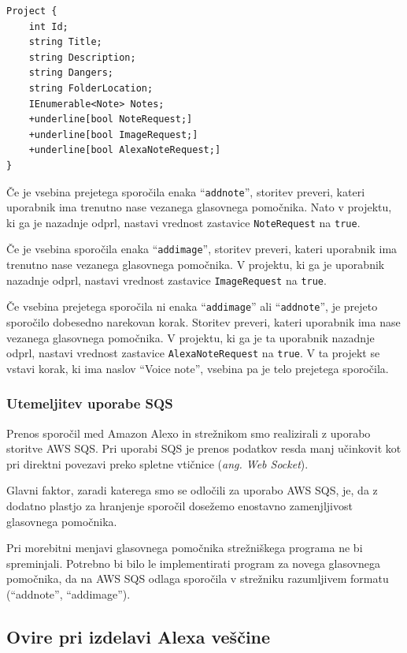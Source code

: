 \documentclass[a4paper, 12pt]{book}
\begin{document}
\begin{Verbatim}[commandchars=+\[\]]
Project { 
    int Id; 
    string Title; 
    string Description; 
    string Dangers; 
    string FolderLocation; 
    IEnumerable<Note> Notes; 
    +underline[bool NoteRequest;] 
    +underline[bool ImageRequest;] 
    +underline[bool AlexaNoteRequest;] 
}
\end{Verbatim}


Če je vsebina prejetega sporočila enaka \enquote{\texttt{addnote}}, storitev preveri, kateri uporabnik ima trenutno nase vezanega glasovnega pomočnika.
Nato v projektu, ki ga je nazadnje odprl, nastavi vrednost zastavice \texttt{NoteRequest} na \texttt{true}.


Če je vsebina sporočila enaka \enquote{\texttt{addimage}}, storitev preveri, kateri uporabnik ima trenutno nase vezanega glasovnega pomočnika.
V projektu, ki ga je uporabnik nazadnje odprl, nastavi vrednost zastavice \texttt{ImageRequest} na \texttt{true}.

Če vsebina prejetega sporočila ni enaka \enquote{\texttt{addimage}} ali \enquote{\texttt{addnote}}, je prejeto sporočilo dobesedno narekovan korak.
Storitev preveri, kateri uporabnik ima nase vezanega glasovnega pomočnika.
V projektu, ki ga je ta uporabnik nazadnje odprl, nastavi vrednost zastavice \texttt{AlexaNoteRequest} na \texttt{true}.
V ta projekt se vstavi korak, ki ima naslov \enquote{Voice note}, vsebina pa je telo prejetega sporočila.

\subsubsection{Utemeljitev uporabe SQS}

Prenos sporočil med Amazon Alexo in strežnikom smo realizirali z uporabo storitve AWS SQS.
Pri uporabi SQS je prenos podatkov resda manj učinkovit kot pri direktni povezavi preko spletne vtičnice (\textit{ang. Web Socket}).

Glavni faktor, zaradi katerega smo se odločili za uporabo AWS SQS, je, da z dodatno plastjo za hranjenje sporočil dosežemo enostavno zamenjljivost glasovnega pomočnika.

Pri morebitni menjavi glasovnega pomočnika strežniškega programa ne bi spreminjali.
Potrebno bi bilo le implementirati program za novega glasovnega pomočnika, da na AWS SQS odlaga sporočila v strežniku razumljivem formatu (\enquote{addnote}, \enquote{addimage}).


\subsection{Ovire pri izdelavi Alexa veščine}
\end{document}
